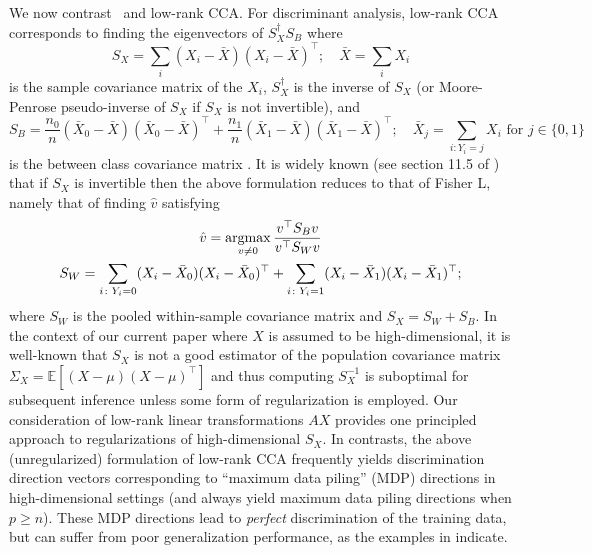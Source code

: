 \documentclass[11pt]{extarticle}
\begin{document}
We now contrast \Lol~and low-rank CCA. For discriminant analysis, low-rank CCA corresponds to finding the eigenvectors of $S_{X}^{\dagger} S_{B}$ where $$S_{X} = \sum_{i} (X_i - \bar{X}) (X_i - \bar{X})^{\top}; \quad \bar{X} = \sum_{i} X_i $$
is the sample covariance matrix of the $X_i$, $S_{X}^{\dagger}$ is the inverse of $S_X$ (or Moore-Penrose pseudo-inverse of $S_X$ if $S_X$ is not invertible), and
$$ S_{B} = \frac{n_0}{n} (\bar{X}_0 - \bar{X}) (\bar{X}_0 - \bar{X})^{\top} + \frac{n_1}{n} (\bar{X}_1 - \bar{X}) (\bar{X}_1 - \bar{X})^{\top}; \quad \bar{X}_{j} = \sum_{i \colon Y_i = j} X_i \,\, \text{for $j \in \{0,1\}$} $$
is the between class covariance matrix \cite{Shin11}. It is widely known (see section 11.5 of \cite{mardia}) that if $S_{X}$ is invertible then the above formulation reduces to that of Fisher \:L, namely that of finding $\hat{v}$ satisfying
\begin{gather*} \hat{v} = \argmax_{v \not = 0} \frac{v^{\top} S_B v}{v^{\top} S_W v} \\ S_W = \sum_{i \colon Y_i = 0} (X_i - \bar{X}_0) (X_i - \bar{X}_0)^{\top} + \sum_{i \colon Y_i = 1} (X_i - \bar{X}_1) (X_i - \bar{X}_1)^{\top};
\end{gather*}
where $S_W$ is the pooled
within-sample covariance matrix and $S_X = S_W + S_B$.
In the context of our current paper where $X$ is assumed to be high-dimensional, it is well-known that $S_X$ is not a good estimator of the population covariance matrix $\Sigma_X = \mathbb{E}[(X - \mu) (X - \mu)^{\top}]$ and thus computing $S_X^{-1}$ is suboptimal for subsequent inference unless some form of regularization is employed. Our consideration of low-rank linear transformations $AX$ provides one principled approach to regularizations of high-dimensional $S_X$. In contrasts, the above (unregularized) formulation of low-rank CCA frequently yields discrimination direction vectors corresponding to ``maximum data piling'' (MDP) directions \cite{Shin11,maximum1} in high-dimensional settings (and always yield maximum data piling directions when $p \ge n$). These MDP directions lead to {\em perfect} discrimination of the training data, but can suffer from poor generalization performance,
as the examples in \cite{Shin11,maximum1} indicate.
\end{document}
